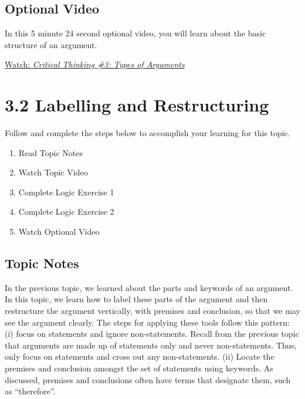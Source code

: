 \documentclass[
]{book}
\providecommand{\tightlist}{%
  \setlength{\itemsep}{0pt}\setlength{\parskip}{0pt}}
\begin{document}
\hypertarget{optional-video-8}{%
\subsection*{Optional Video}\label{optional-video-8}}

\begin{reflect}
In this 5 minute 24 second optional video, you will learn about the basic structure of an argument.

\href{https://www.youtube.com/watch?v=wbRxR53F3rI}{Watch: \emph{Critical Thinking \#3: Types of Arguments}}
\end{reflect}

\hypertarget{labelling-and-restructuring}{%
\section*{3.2 Labelling and Restructuring}\label{labelling-and-restructuring}}

Follow and complete the steps below to accomplish your learning for this topic.

\begin{enumerate}
\def\labelenumi{\arabic{enumi}.}
\tightlist
\item
  Read Topic Notes
\item
  Watch Topic Video
\item
  Complete Logic Exercise 1
\item
  Complete Logic Exercise 2
\item
  Watch Optional Video
\end{enumerate}

\hypertarget{topic-notes-9}{%
\subsection*{Topic Notes}\label{topic-notes-9}}

In the previous topic, we learned about the parts and keywords of an argument. In this topic, we learn how to label these parts of the argument and then restructure the argument vertically, with premises and conclusion, so that we may see the argument clearly. The steps for applying these tools follow this pattern: (i) focus on statements and ignore non-statements. Recall from the previous topic that arguments are made up of statements only and never non-statements. Thus, only focus on statements and cross out any non-statements. (ii) Locate the premises and conclusion amongst the set of statements using keywords. As discussed, premises and conclusions often have terms that designate them, such as ``therefore''.
\end{document}
